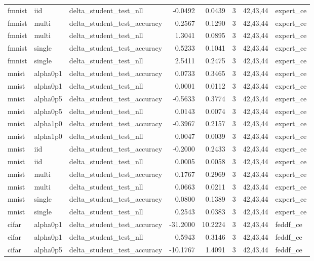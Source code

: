 \begin{tabular}{lllrrrll}
fmnist & iid & delta\_student\_test\_nll & -0.0492 & 0.0439 & 3 & 42,43,44 & expert\_ce \\
fmnist & multi & delta\_student\_test\_accuracy & 0.2567 & 0.1290 & 3 & 42,43,44 & expert\_ce \\
fmnist & multi & delta\_student\_test\_nll & 1.3041 & 0.0895 & 3 & 42,43,44 & expert\_ce \\
fmnist & single & delta\_student\_test\_accuracy & 0.5233 & 0.1041 & 3 & 42,43,44 & expert\_ce \\
fmnist & single & delta\_student\_test\_nll & 2.5411 & 0.2475 & 3 & 42,43,44 & expert\_ce \\
mnist & alpha0p1 & delta\_student\_test\_accuracy & 0.0733 & 0.3465 & 3 & 42,43,44 & expert\_ce \\
mnist & alpha0p1 & delta\_student\_test\_nll & 0.0001 & 0.0112 & 3 & 42,43,44 & expert\_ce \\
mnist & alpha0p5 & delta\_student\_test\_accuracy & -0.5633 & 0.3774 & 3 & 42,43,44 & expert\_ce \\
mnist & alpha0p5 & delta\_student\_test\_nll & 0.0143 & 0.0074 & 3 & 42,43,44 & expert\_ce \\
mnist & alpha1p0 & delta\_student\_test\_accuracy & -0.3967 & 0.2157 & 3 & 42,43,44 & expert\_ce \\
mnist & alpha1p0 & delta\_student\_test\_nll & 0.0047 & 0.0039 & 3 & 42,43,44 & expert\_ce \\
mnist & iid & delta\_student\_test\_accuracy & -0.2000 & 0.2433 & 3 & 42,43,44 & expert\_ce \\
mnist & iid & delta\_student\_test\_nll & 0.0005 & 0.0058 & 3 & 42,43,44 & expert\_ce \\
mnist & multi & delta\_student\_test\_accuracy & 0.1767 & 0.2969 & 3 & 42,43,44 & expert\_ce \\
mnist & multi & delta\_student\_test\_nll & 0.0663 & 0.0211 & 3 & 42,43,44 & expert\_ce \\
mnist & single & delta\_student\_test\_accuracy & 0.0800 & 0.1389 & 3 & 42,43,44 & expert\_ce \\
mnist & single & delta\_student\_test\_nll & 0.2543 & 0.0383 & 3 & 42,43,44 & expert\_ce \\
cifar & alpha0p1 & delta\_student\_test\_accuracy & -31.2000 & 10.2224 & 3 & 42,43,44 & feddf\_ce \\
cifar & alpha0p1 & delta\_student\_test\_nll & 0.5943 & 0.3146 & 3 & 42,43,44 & feddf\_ce \\
cifar & alpha0p5 & delta\_student\_test\_accuracy & -10.1767 & 1.4091 & 3 & 42,43,44 & feddf\_ce \\

\end{tabular}
